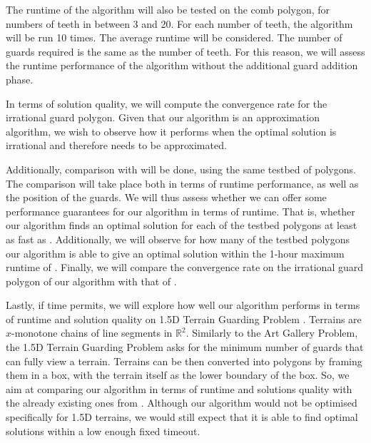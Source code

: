 The runtime of the algorithm will also be tested on the comb polygon, for  numbers of teeth in between 3 and 20. For each number of teeth, the algorithm will be run 10 times. The average runtime will be considered. The number of guards required is the same as the number of teeth. For this reason, we will assess the runtime performance of the algorithm without the additional guard addition phase. 

In terms of solution quality, we will compute the convergence rate for the irrational guard polygon. Given that our algorithm is an approximation algorithm, we wish to observe how it performs when the optimal solution is irrational and therefore needs to be approximated.

Additionally, comparison with \cite{DBLP:journals/corr/abs-2007-06920} will be done, using the same testbed of polygons. The comparison will take place both in terms of runtime performance, as well as the position of the guards. We will thus assess whether we can offer some performance guarantees for our algorithm in terms of runtime. That is, whether our algorithm finds an optimal solution for each of the testbed polygons at least as fast as \cite{DBLP:journals/corr/abs-2007-06920}. Additionally, we will observe for how many of the testbed polygons our algorithm is able to give an optimal solution within the 1-hour maximum runtime of \cite{DBLP:journals/corr/abs-2007-06920}. Finally, we will compare the convergence rate on the irrational guard polygon of our algorithm with that of \cite{DBLP:journals/corr/abs-2007-06920}.

Lastly, if time permits, we will explore how well our algorithm performs in terms of runtime and solution quality on 1.5D Terrain Guarding Problem \cite{https://doi.org/10.48550/arxiv.1509.08285}. Terrains are $x$-monotone chains of line segments in $\mathbb R^2$. Similarly to the Art Gallery Problem, the 1.5D Terrain Guarding Problem asks for the minimum number of guards that can fully view a terrain. Terrains can be then converted into polygons by framing them in a box, with the terrain itself as the lower boundary of the box. So, we aim at comparing our algorithm in terms of runtime and solutions quality with the already existing ones from \cite{https://doi.org/10.48550/arxiv.1509.08285}. Although our algorithm would not be optimised specifically for 1.5D terrains, we would still expect that it is able to find optimal solutions within a low enough fixed timeout.



